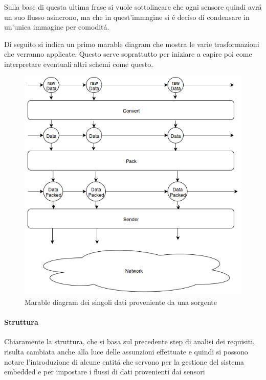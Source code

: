 Sulla base di questa ultima frase si vuole sottolineare che ogni sensore quindi avr\'a un suo flusso asincrono, ma che in quest'immagine si \'e deciso di condensare in un'unica immagine per comodit\'a.

Di seguito si indica un primo marable diagram che mostra le varie trasformazioni che verranno applicate. Questo serve soprattutto per iniziare a capire poi come interpretare eventuali altri schemi come questo.

\begin{figure}[ht]
\centering
\includegraphics[scale=0.7]{Figures/LogicArchitecture/EmbeddedSystem/MarableDiagram}
\caption{Marable diagram dei singoli dati proveniente da una sorgente}
\end{figure}


\afterpage{\clearpage}

\newpage


\paragraph{Struttura} Chiaramente la struttura, che si basa sul precedente step di analisi dei requisiti, risulta cambiata anche alla luce delle assunzioni effettuate e quindi si possono notare l'introduzione di alcune entit\'a che servono per la gestione del sistema embedded e per impostare i flussi di dati provenienti dai sensori


